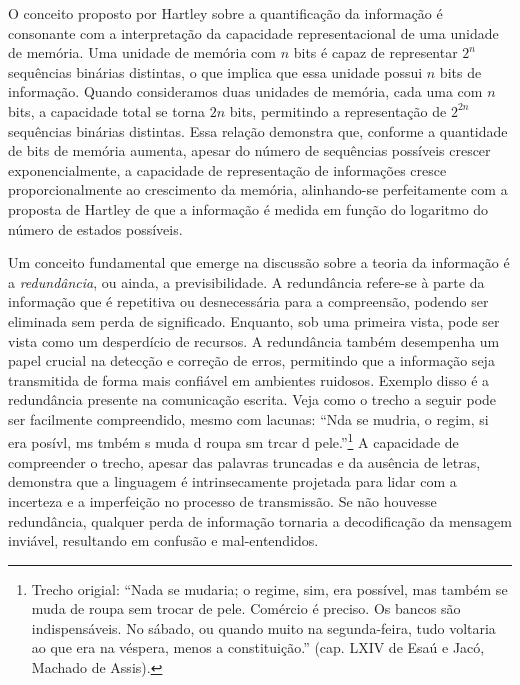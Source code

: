 O conceito proposto por Hartley sobre a quantificação da informação é
consonante com a interpretação da capacidade representacional de
uma unidade de memória. Uma unidade de memória com $n$ bits
é capaz de representar $2^n$ sequências binárias distintas, o que implica que
essa unidade possui $n$ bits de informação. Quando consideramos duas unidades
de memória, cada uma com $n$ bits, a capacidade total se torna $2n$ bits,
permitindo a representação de $2^{2n}$ sequências binárias distintas. Essa
relação demonstra que, conforme a quantidade de bits de memória aumenta,
apesar do número de sequências possíveis crescer exponencialmente, a
capacidade de representação de informações cresce proporcionalmente ao crescimento
da memória, alinhando-se perfeitamente com a proposta de Hartley de que a informação é
medida em função do logaritmo do número de estados possíveis.

Um conceito fundamental que emerge na discussão sobre a teoria da informação é
a \emph{redundância}, ou ainda, a previsibilidade. A redundância refere-se à parte da
informação que é repetitiva ou desnecessária para a compreensão, podendo ser
eliminada sem perda de significado. Enquanto, sob uma primeira vista, pode ser
vista como um desperdício de recursos. A redundância também desempenha um papel
crucial na detecção e correção de erros, permitindo que a informação seja
transmitida de forma mais confiável em ambientes ruidosos. Exemplo disso é a
redundância presente na comunicação escrita. Veja como o trecho a seguir pode
ser facilmente compreendido, mesmo com lacunas: ``Nda se mudria, o regim, si
era posívl, ms tmbém s muda d roupa sm trcar d pele.''\footnote{Trecho origial:
  ``Nada se mudaria; o regime, sim, era possível, mas também se muda de roupa
  sem trocar de pele. Comércio é preciso. Os bancos são indispensáveis. No
  sábado, ou quando muito na segunda-feira, tudo voltaria ao que era na
  véspera, menos a constituição.'' (cap. LXIV de Esaú e Jacó, Machado de
Assis).} A capacidade de compreender o trecho, apesar das palavras truncadas e
da ausência de letras, demonstra que a linguagem é intrinsecamente projetada
para lidar com a incerteza e a imperfeição no processo de transmissão. Se não
houvesse redundância, qualquer perda de informação tornaria a decodificação da
mensagem inviável, resultando em confusão e mal-entendidos.

